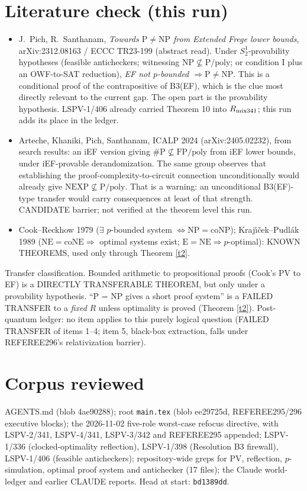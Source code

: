 \documentclass[11pt]{article}
\begin{document}
\section{Literature check (this run)}
\begin{itemize}
\item J.~Pich, R.~Santhanam, \emph{Towards $\mathrm P\ne\mathrm{NP}$ from Extended Frege lower bounds},
arXiv:2312.08163 / ECCC TR23-199 (abstract read). Under $S^1_2$-provability hypotheses
(feasible anticheckers; witnessing $\mathrm{NP}\not\subseteq\mathrm{P/poly}$; or condition I plus an
OWF-to-SAT reduction), \emph{EF not $p$-bounded $\Rightarrow\mathrm P\ne\mathrm{NP}$}. This is a
conditional proof of the contrapositive of B3(EF), which is the clue most directly relevant to the
current gap. The open part is the provability hypothesis. LSPV-1/406 already carried
Theorem 10 into $R_{\rm mix341}$; this run adds its place in the ledger.
\item Arteche, Khaniki, Pich, Santhanam, ICALP 2024 (arXiv:2405.02232), from search results:
an iEF version giving $\#\mathrm P\not\subseteq\mathrm{FP/poly}$ from iEF lower bounds, under
iEF-provable derandomization. The same group observes that establishing the
proof-complexity-to-circuit connection unconditionally would already give
$\mathrm{NEXP}\not\subseteq\mathrm{P/poly}$. That is a warning: an unconditional B3(EF)-type
transfer would carry consequences at least of that strength. CANDIDATE barrier; not verified at
the theorem level this run.
\item Cook--Reckhow 1979 ($\exists$ $p$-bounded system $\iff\mathrm{NP}=\mathrm{coNP}$);
Kraj\'{\i}\v{c}ek--Pudl\'ak 1989 ($\mathrm{NE}=\mathrm{coNE}\Rightarrow$ optimal systems exist;
$\mathrm E=\mathrm{NE}\Rightarrow p$-optimal): KNOWN THEOREMS, used only through Theorem \ref{t2}.
\end{itemize}
Transfer classification. Bounded arithmetic to propositional proofs (Cook's PV to EF) is a
DIRECTLY TRANSFERABLE THEOREM, but only under a provability hypothesis. ``P = NP gives a
short proof system'' is a FAILED TRANSFER to a \emph{fixed} $R$ unless optimality is proved
(Theorem \ref{t2}). Post-quantum ledger: no item applies to this purely logical question
(FAILED TRANSFER of items 1--4; item 5, black-box extraction, falls under REFEREE296's
relativization barrier).

\section*{Corpus reviewed}
AGENTS.md (blob 4ae90288); root \texttt{main.tex} (blob ee29725d, REFEREE295/296 executive
blocks); the 2026-11-02 five-role worst-case refocus directive, with LSPV-2/341, LSPV-4/341,
LSPV-3/342 and REFEREE295 appended; LSPV-1/336 (clocked-optimality reflection), LSPV-1/398
(Resolution B3 firewall), LSPV-1/406 (feasible anticheckers); repository-wide greps for PV,
reflection, $p$-simulation, optimal proof system and antichecker (17 files); the Claude
world-ledger and earlier CLAUDE reports. Head at start: \texttt{bd1389dd}.
\end{document}
